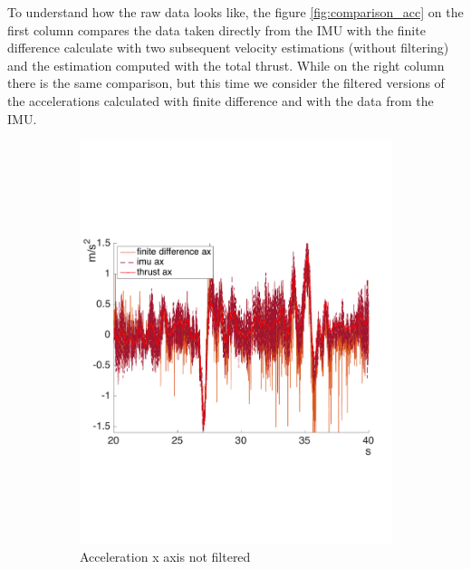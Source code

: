 To understand how the raw data looks like, the figure \ref{fig:comparison_acc} on the first column compares the data taken directly from the IMU with the finite difference calculate with two subsequent velocity estimations (without filtering) and the estimation computed with the total thrust. While on the right column there is the same comparison, but this time we consider the filtered versions of the accelerations calculated with finite difference and with the data from the IMU.
\begin{figure}[!htbp]
 \centering   
     \begin{subfigure}[b]{0.45\textwidth}
     \includegraphics[width=\textwidth]{img/acc_x_raw.pdf}
        \caption{Acceleration x axis not filtered}
        \label{fig:comparison_accx}
   \end{subfigure}
    \begin{subfigure}[b]{0.45\textwidth}

\end{subfigure}
\end{figure}
